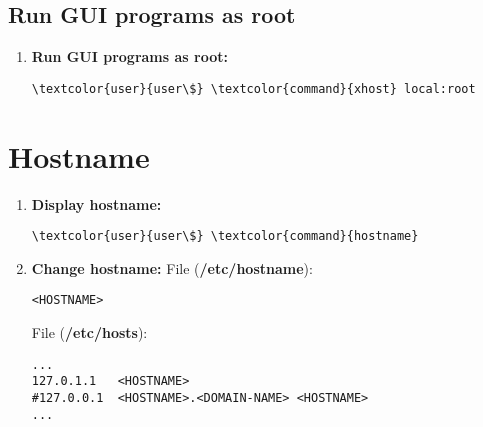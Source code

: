 \documentclass[10pt, a4paper, onecolumn, openany]{book} %
\begin{document}
\subsection{Run GUI programs as root}
\begin{enumerate}
    \item \textbf{Run GUI programs as root:}
\begin{Verbatim}[commandchars=\\\{\}]
\textcolor{user}{user\$} \textcolor{command}{xhost} local:root
\end{Verbatim}
\end{enumerate}
\section{Hostname}
\begin{enumerate}
    \item \textbf{Display hostname:}
\begin{Verbatim}[commandchars=\\\{\}]
\textcolor{user}{user\$} \textcolor{command}{hostname}
\end{Verbatim}
    \item \textbf{Change hostname:}
\newline File (\textbf{\textcolor{file}{/etc/hostname}}):
\begin{Verbatim}[commandchars=\\\{\}]
<HOSTNAME>
\end{Verbatim}
File (\textbf{\textcolor{file}{/etc/hosts}}):
\begin{Verbatim}[commandchars=\\\{\}]
...
127.0.1.1   <HOSTNAME>
#127.0.0.1  <HOSTNAME>.<DOMAIN-NAME> <HOSTNAME>
...
\end{Verbatim}
\end{enumerate}
\end{document}
